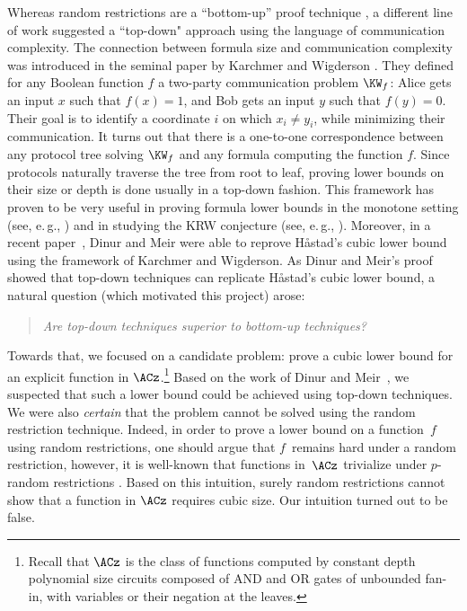 \documentclass[11pt]{article}
\numberwithin{equation}{section}
\theoremstyle{definition}
\theoremstyle{plain}
\newcommand{\eg}{e.\,g.}
\theoremstyle{definition}\newtheorem{notation}[theorem]{Notation}\theoremstyle{plain}
\begin{document}
Whereas random restrictions are a ``bottom-up'' proof technique
\cite{HJP95}, a different line of work suggested a ``top-down"
approach using the language of communication complexity. The connection
between formula size and communication complexity was introduced in
the seminal %
paper by %
Karchmer and Wigderson \cite{KW90}. They defined
for any Boolean function $f$ a two-party communication problem $\KW_{f}$:
Alice gets an input $x$ such that $f(x)=1$, and Bob gets an input
$y$ such that $f(y)=0$. Their goal is to identify a coordinate $i$
on which $x_{i}\neq y_{i}$, while minimizing their communication.
It turns out that there is a one-to-one correspondence between any
protocol tree solving $\KW_{f}$ and any formula computing the function
$f$. Since protocols naturally traverse the tree from root to leaf,
proving lower bounds on their size or depth is done usually in a top-down
fashion. This framework has proven to be very useful in proving formula
lower bounds in the monotone setting (see, \eg, \cite{KW90,GH92,RW92,KRW95,RM99,GP18,PR17})
and in studying the KRW conjecture (see, \eg, \cite{KRW95,EIRS01,HW93,GMWW17,DM18,KM18,M20,RMNPR20,MS21}).
Moreover,
%
in a recent paper~\cite{DM18}, Dinur and Meir were able to %
reprove H{\aa}stad's cubic lower bound using the framework of Karchmer
and Wigderson. As Dinur and Meir's proof showed that top-down techniques
can replicate H{\aa}stad's cubic lower bound, a natural question
(which motivated this project) arose: 
\begin{quote}
\emph{Are top-down techniques superior to bottom-up techniques?} 
\end{quote}
Towards that, we focused on a candidate problem: prove a cubic lower
bound for an explicit function in $\ACz$.\footnote{Recall that $\ACz$ is the class of functions computed by constant
depth polynomial size circuits composed of AND and OR gates of unbounded
fan-in, with variables or their negation at the leaves.} Based on the 
work of Dinur and Meir~\cite{DM18}, we suspected that
such a lower bound could be achieved using top-down techniques. We
were also \emph{certain} that the problem cannot be solved using the
random restriction technique. Indeed, in order to prove a lower bound
on a function~$f$ using random restrictions, one should argue that
$f$~remains hard under a random restriction, however, it is well-known
that functions in~$\ACz$ trivialize under $p$-random restrictions
\cite{A83,FSS84,Y85,H86}. Based on this intuition, surely random
restrictions cannot show that a function in $\ACz$ requires cubic
size. Our intuition turned out to be false.
\end{document}
